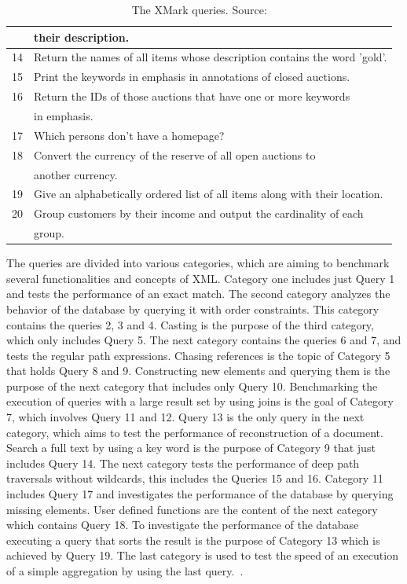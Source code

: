 \begin {table}[htpb]
\begin{tabular}{r|l}
	  &their description.\\
	  \hline
	  14&Return the names of all items whose description contains the word 'gold'.\\
	  \hline
	  15&Print the keywords in emphasis in annotations of closed auctions.\\
	  \hline
	  16&Return the IDs of those auctions that have one or more keywords\\
	  &in emphasis.\\
	  \hline
	  17&Which persons don't have a homepage?\\
	  \hline
	  18&Convert the currency of the reserve of all open auctions to\\
	  &another currency.\\
	  \hline
	  19&Give an alphabetically ordered list of all items along with their location.\\
	  \hline
	  20&Group customers by their income and output the cardinality of each\\
	  &group.\\
	  \hline
	\end{tabular}
	\caption {The XMark queries. Source:\cite{schmidtxmark}}
\label {tab:xmark-queries}
\end {table}


The queries are divided into various categories, which are aiming to benchmark several functionalities and concepts of XML.
Category one includes just Query 1 and tests the performance of an exact match.
The second category analyzes the behavior of the database by querying it with order constraints.
This category contains the queries 2, 3 and 4.
Casting is the purpose of the third category, which only includes Query 5.
The next category contains the queries 6 and 7, and tests the regular path expressions.
Chasing references is the topic of Category 5 that holds Query 8 and 9.
Constructing new elements and querying them is the purpose of the next category that includes only Query 10.
Benchmarking the execution of queries with a large result set by using joins is the goal of Category 7, which involves Query 11 and 12.
Query 13 is the only query in the next category, which aims to test the performance of reconstruction of a document.
Search a full text by using a key word is the purpose of Category 9 that just includes Query 14.
The next category tests the performance of deep path traversals without wildcards, this includes the Queries 15 and 16.
Category 11 includes Query 17 and investigates the performance of the database by querying missing elements.
User defined functions are the content of the next category which contains Query 18.
To investigate the performance of the database executing a query that sorts the result is the purpose of Category 13 which is achieved by Query 19.
The last category is used to test the speed of an execution of a simple aggregation by using the last query.~\cite{schmidtxmark}.

